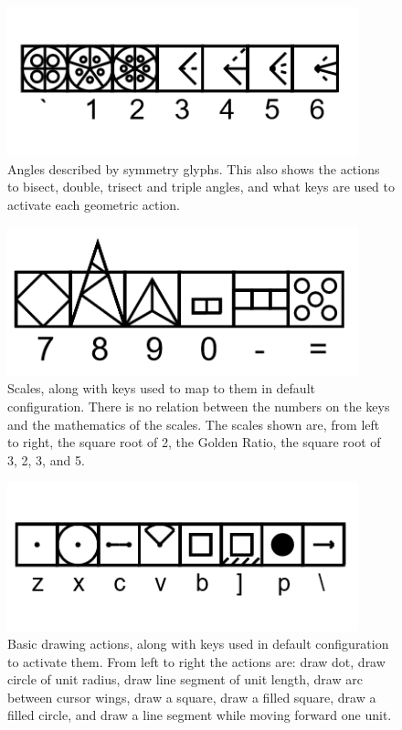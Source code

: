 \begin{figure}
	\centering
	\includegraphics[width=4in]{figures/web2d/angles.png}
	\caption[angles]
	{Angles described by symmetry glyphs.  This also shows the actions to bisect, double, trisect and triple angles, and what keys are used to activate each geometric action.}
\end{figure}

\begin{figure}
	\centering
	\includegraphics[width=4in]{figures/web2d/scaleactions.png}
	\caption[scaleactions]
	{Scales, along with keys used to map to them in default configuration. There is no relation between the numbers on the keys and the mathematics of the scales.  The scales shown are, from left to right, the square root of 2, the Golden Ratio, the square root of 3, 2, 3, and 5.}
\end{figure}

\begin{figure}
	\centering
	\includegraphics[width=4in]{figures/web2d/basicdraw.png}
	\caption[basicdraw]
	{Basic drawing actions, along with keys used in default configuration to activate them.  From left to right the actions are: draw dot, draw circle of unit radius, draw line segment of unit length, draw arc between cursor wings, draw a square, draw a filled square, draw a filled circle, and draw a line segment while moving forward one unit.}
\end{figure}

